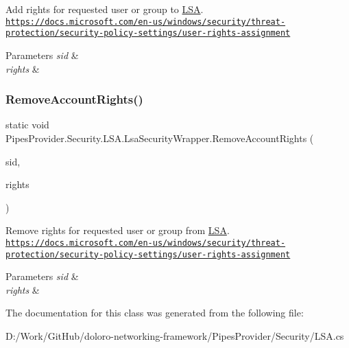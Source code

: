 Add rights for requested user or group to \mbox{\hyperlink{namespace_pipes_provider_1_1_security_1_1_l_s_a}{L\+SA}}. \href{https://docs.microsoft.com/en-us/windows/security/threat-protection/security-policy-settings/user-rights-assignment}{\tt https\+://docs.\+microsoft.\+com/en-\/us/windows/security/threat-\/protection/security-\/policy-\/settings/user-\/rights-\/assignment} 


\begin{DoxyParams}{Parameters}
{\em sid} & \\
\hline
{\em rights} & \\
\hline
\end{DoxyParams}
\mbox{\label{class_pipes_provider_1_1_security_1_1_l_s_a_1_1_lsa_security_wrapper_ad14aaa2cffa5be534590d0ef30810117}} 
\subsubsection{\texorpdfstring{Remove\+Account\+Rights()}{RemoveAccountRights()}}
{\footnotesize\ttfamily static void Pipes\+Provider.\+Security.\+L\+S\+A.\+Lsa\+Security\+Wrapper.\+Remove\+Account\+Rights (\begin{DoxyParamCaption}\item[{Security\+Identifier}]{sid,  }\item[{string}]{rights }\end{DoxyParamCaption})\hspace{0.3cm}{\ttfamily [static]}}



Remove rights for requested user or group from \mbox{\hyperlink{namespace_pipes_provider_1_1_security_1_1_l_s_a}{L\+SA}}. \href{https://docs.microsoft.com/en-us/windows/security/threat-protection/security-policy-settings/user-rights-assignment}{\tt https\+://docs.\+microsoft.\+com/en-\/us/windows/security/threat-\/protection/security-\/policy-\/settings/user-\/rights-\/assignment} 


\begin{DoxyParams}{Parameters}
{\em sid} & \\
\hline
{\em rights} & \\
\hline
\end{DoxyParams}


The documentation for this class was generated from the following file\+:\begin{DoxyCompactItemize}
\item 
D\+:/\+Work/\+Git\+Hub/doloro-\/networking-\/framework/\+Pipes\+Provider/\+Security/L\+S\+A.\+cs\end{DoxyCompactItemize}
